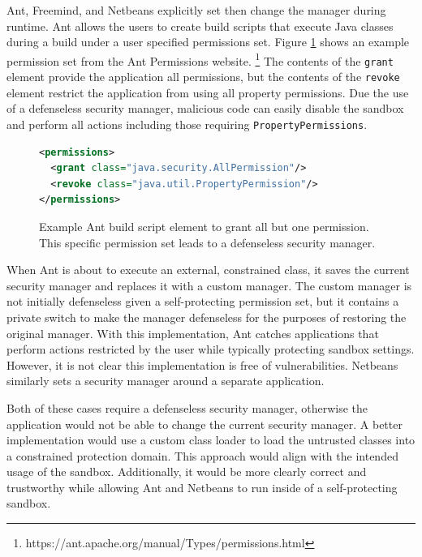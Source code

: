 \documentclass{sig-alternate}
\begin{document}
Ant, Freemind, and Netbeans explicitly set then change the manager
during runtime. Ant allows the users to create build scripts that
execute Java classes during a build under a user specified
permissions set. Figure \ref{fig:Ant Permissions Example}
shows an example permission set from the Ant Permissions website.%
\footnote{https://ant.apache.org/manual/Types/permissions.html%
} The contents of the \texttt{grant} element provide the application
all permissions, but the contents of the \texttt{revoke} element restrict
the application from using all property permissions. Due the use of a
defenseless security manager, malicious code can easily disable the sandbox and perform all actions
including those requiring \texttt{PropertyPermissions}.

\begin{figure}
\begin{lstlisting}[language=XML,basicstyle={\scriptsize}]
<permissions>   
  <grant class="java.security.AllPermission"/>   
  <revoke class="java.util.PropertyPermission"/> 
</permissions>
\end{lstlisting}

\caption{Example Ant build script element to grant all but one permission.
This specific permission set leads to a defenseless security manager.}
\label{fig:Ant Permissions Example}
\end{figure}

When Ant is about to execute an external, constrained class, it saves the current security manager and replaces it with a custom manager. The custom manager is not initially defenseless given a self-protecting permission set, but it contains a private switch to make the manager defenseless for the purposes of restoring the original manager. With this implementation, Ant catches applications that perform actions
restricted by the user while typically protecting sandbox settings. However, it is not clear this implementation
is free of vulnerabilities. Netbeans similarly sets a security manager around a separate application.

Both of these cases require a defenseless security manager, otherwise
the application would not be able to change the current security manager.
A better implementation would use a custom class
loader to load the untrusted classes into a constrained protection
domain. This approach would align with the intended usage of the sandbox.
Additionally, it would be more clearly correct and trustworthy while
allowing Ant and Netbeans to run inside of a self-protecting sandbox.
\end{document}

